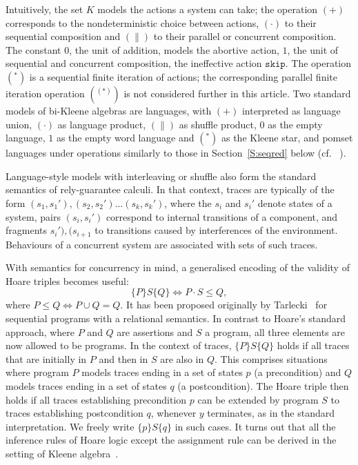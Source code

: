 \documentclass[review]{elsart}
\newcommand{\triple}[3]{\{#1\}#2\{#3\}}
\begin{document}

Intuitively, the set $K$ models the actions a system can take; the operation $(+)$ corresponds to the nondeterministic choice between actions, $(\cdot)$ to their sequential composition and $(\|)$ to their parallel or concurrent composition. The constant $0$, the unit of addition, models the abortive action, $1$, the unit of sequential and concurrent composition, the ineffective action $\mathtt{skip}$. The operation $(^\ast)$ is a sequential finite iteration of actions; the corresponding parallel finite iteration operation $(^{(\ast)})$ is not considered further in this article. Two standard models of bi-Kleene algebras are languages, with $(+)$ interpreted as language union, $(\cdot)$ as language product, $(\|)$ as shuffle product, $0$ as the empty language, $1$ as the empty word language and $(^\ast)$ as the Kleene star, and pomset languages under operations similarly to those in Section~\ref{S:seqred} below (cf. ~\cite{BloomEsik}).

Language-style models with interleaving or shuffle also form the standard semantics of rely-guarantee calculi. In that context, traces are typically of the form $(s_1,s_1'),(s_2,s_2')\dots (s_k,s_k')$, where the $s_i$ and $s_i'$ denote states of a system, pairs $(s_i,s_i')$ correspond to internal transitions of a component, and fragments $s_i'),(s_{i{+}1}$ to transitions caused by interferences of the environment. Behaviours of a concurrent system are associated with sets of such traces.

With semantics for concurrency in mind, a generalised encoding of the validity of Hoare triples becomes useful:  
\begin{equation*}
  \triple{P}{S}{Q} \Leftrightarrow P{\cdot} S \le Q,
\end{equation*}
where $P\le Q \Leftrightarrow P{\cup} Q = Q$.  It has been proposed originally by Tarlecki~\cite{Tar85} for sequential programs with a relational semantics. In contrast to Hoare's standard approach, where $P$ and $Q$ are assertions and $S$ a program, all three elements are now allowed to be programs. In the context of traces, $\triple{P}{S}{Q}$ holds if all traces that are initially in $P$ and then in $S$ are also in $Q$. This comprises situations where program $P$ models traces ending in a set of states $p$ (a precondition) and $Q$ models traces ending in a set of states $q$ (a postcondition). The Hoare triple then holds if all traces establishing precondition $p$ can be extended by program $S$ to traces establishing postcondition $q$, whenever $y$ terminates, as in the standard interpretation. We freely write $\triple{p}{S}{q}$ in such cases. It turns out that all the inference rules of Hoare logic except the assignment rule can be derived in the setting of Kleene algebra~\cite{Hoa11}.
\end{document}
